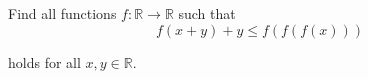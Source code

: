 Find all functions $f: \mathbb{R} \to \mathbb{R}$ such that\[f(x + y) + y \le f(f(f(x)))\]

holds for all $x, y \in \mathbb{R}$.